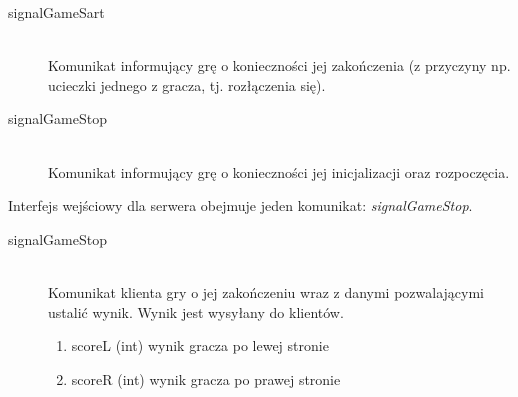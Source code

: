 \begin{description}
	\item[signalGameSart] \hfill \\
	Komunikat informujący grę o konieczności jej zakończenia (z przyczyny np. ucieczki jednego z gracza, tj. rozłączenia się).
\end{description}

\begin{description}
	\item[signalGameStop] \hfill \\
	Komunikat informujący grę o konieczności jej inicjalizacji oraz rozpoczęcia.
\end{description}

Interfejs wejściowy dla serwera obejmuje jeden komunikat:  \emph{signalGameStop}.

\begin{description}
	\item[signalGameStop] \hfill \\
	Komunikat klienta gry o jej zakończeniu wraz z danymi pozwalającymi ustalić wynik. Wynik jest wysyłany do klientów.
	\begin{enumerate}
		\item scoreL (int) wynik gracza po lewej stronie
		\item scoreR (int) wynik gracza po prawej stronie
	\end{enumerate}
\end{description}
